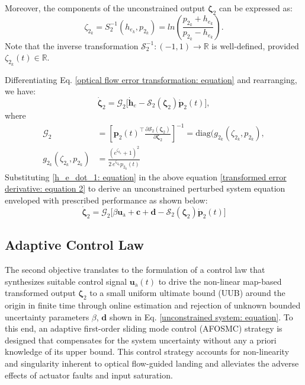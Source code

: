 \documentclass[lettersize,journal]{IEEEtran}
\begin{document}
Moreover, the components of the unconstrained output $\boldsymbol{\zeta}_2$ can be expressed as:
\begin{equation} \label{inverse transformation function for inner loop}
    \zeta_{2_k} = S^{-1}_2(h_{e_k}, p_{2_k}) = ln \left(\frac{p_{2_k} + h_{e_k}}{p_{2_k} - h_{e_k}} \right).
\end{equation}
Note that the inverse transformation $\mathcal{S}_2^{-1}: (-1, 1) \to \mathbb{R}$ is well-defined, provided $\zeta_{2_k}(t) \in \mathbb{R}$.

Differentiating Eq. \eqref{optical flow error transformation: equation} and rearranging, we have:
\begin{equation} \label{transformed error derivative: equation 2}
    \dot{\boldsymbol{\zeta}}_2 = \mathcal{G}_2 \big[\dot{\boldsymbol{h}}_{e} - \mathcal{S}_2(\boldsymbol{\zeta}_2) \dot{\boldsymbol{p}}_2(t)\big],    
\end{equation}
where
\begin{align*}
    \mathcal{G}_2 &= \left[\boldsymbol{p}_2(t)^{\top} \frac{\partial \mathcal{S}_2(\boldsymbol{\zeta}_2)}{\partial \boldsymbol{\zeta}_2}\right]^{-1} = \text{diag}(g_{2_k}(\zeta_{2_k}, p_{2_k}), \nonumber \\
    g_{2_k}(\zeta_{2_k}, p_{2_k}) &= \frac{(e^{\zeta_{2_k}}+1)^2}{2\,e^{\zeta_{2_k}} p_{2_k}(t)}
\end{align*}
Substituting \eqref{h_e_dot_1: equation} in the above equation \eqref{transformed error derivative: equation 2} to derive an unconstrained perturbed system equation enveloped with prescribed performance as shown below:
\begin{equation} \label{unconstrained system: equation}
    \dot{\boldsymbol{\zeta}}_2 = \mathcal{G}_2 \big[\beta \boldsymbol{u}_\text{a} + \boldsymbol{c} + \boldsymbol{d} - \mathcal{S}_2(\boldsymbol{\zeta}_2) \dot{\boldsymbol{p}}_2(t) \big]
\end{equation}

\subsection{Adaptive Control Law} \label{adaptive controller for inner loop : section}
The second objective translates to the formulation of a control law that synthesizes suitable control signal $\boldsymbol{u}_\text{a}(t)$ to drive the non-linear map-based transformed output $\boldsymbol{\zeta}_2$ to a small uniform ultimate bound (UUB) around the origin in finite time through online estimation and rejection of unknown bounded uncertainty parameters $\beta$, $\boldsymbol{d}$ shown in Eq. \eqref{unconstrained system: equation}.
To this end, an adaptive first-order sliding mode control (AFOSMC) strategy is designed that compensates for the system uncertainty without any a priori knowledge of its upper bound.
This control strategy accounts for non-linearity and singularity inherent to optical flow-guided landing and alleviates the adverse effects of actuator faults and input saturation.
\end{document}
